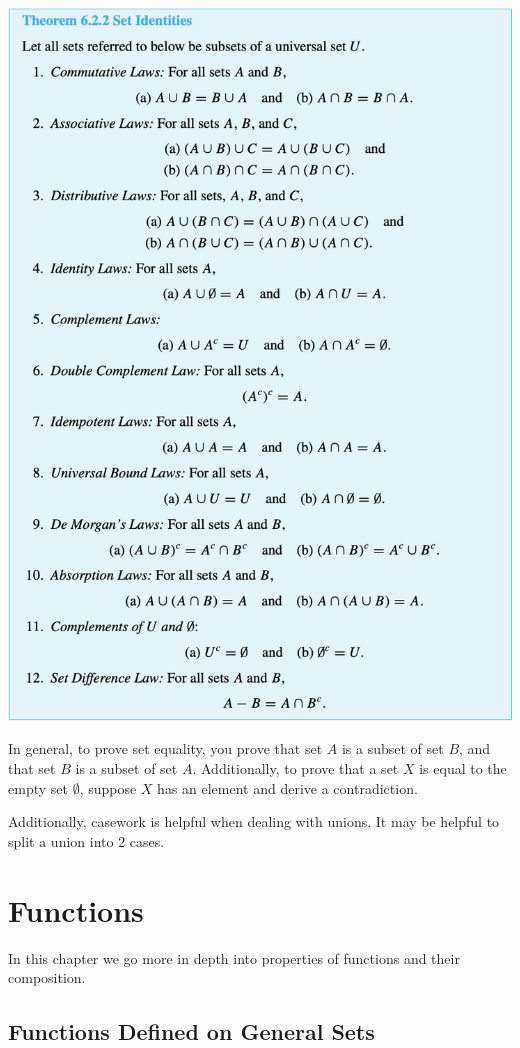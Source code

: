 \documentclass[a4paper]{report}
\begin{document}
\includegraphics[scale=0.65]{setids}

In general, to prove set equality, you prove that set $A$ is a subset of set $B$, and that
set $B$ is a subset of set $A$. Additionally, to prove that a set $X$ is equal to the empty set
$\emptyset$, suppose $X$ has an element and derive a contradiction.

Additionally, casework is helpful when dealing with unions. It may be helpful to split a union into
2 cases.

\chapter{Functions}

In this chapter we go more in depth into properties of functions and their composition.

\section{Functions Defined on General Sets}
\end{document}
